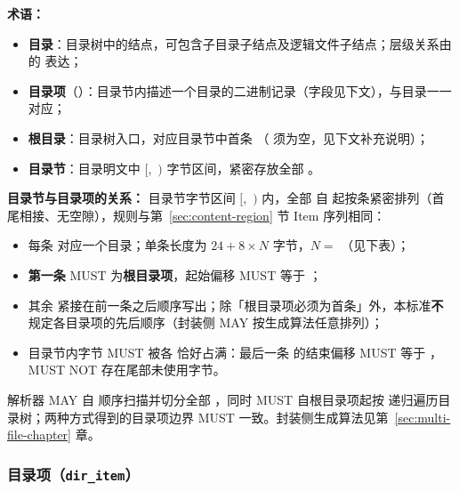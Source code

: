 \textbf{术语：}
\begin{itemize}
  \item \textbf{目录}：目录树中的结点，可包含子目录子结点及逻辑文件子结点；层级关系由  的  表达；
  \item \textbf{目录项}（）：目录节内描述一个目录的二进制记录（字段见下文），与目录一一对应；
  \item \textbf{根目录}：目录树入口，对应目录节中首条 （ 须为空，见下文补充说明）；
  \item \textbf{目录节}：目录明文中 $[$,\ $)$ 字节区间，紧密存放全部 。
\end{itemize}

\textbf{目录节与目录项的关系：}
目录节字节区间 $[$,\ $)$ 内，全部  自  起按条紧密排列（首尾相接、无空隙），规则与第~\ref{sec:content-region} 节 Item 序列相同：
\begin{itemize}
  \item 每条  对应一个目录；单条长度为 $24 + 8 \times N$ 字节，$N =$ （见下表）；
  \item \textbf{第一条} MUST 为\textbf{根目录项}，起始偏移 MUST 等于 ；
  \item 其余  紧接在前一条之后顺序写出；除「根目录项必须为首条」外，本标准\textbf{不}规定各目录项的先后顺序（封装侧 MAY 按生成算法任意排列）；
  \item 目录节内字节 MUST 被各  恰好占满：最后一条  的结束偏移 MUST 等于 ，MUST NOT 存在尾部未使用字节。
\end{itemize}

解析器 MAY 自  顺序扫描并切分全部 ，同时 MUST 自根目录项起按  递归遍历目录树；两种方式得到的目录项边界 MUST 一致。封装侧生成算法见第~\ref{sec:multi-file-chapter} 章。

\subsubsection{目录项（\texttt{dir\_item}）}

